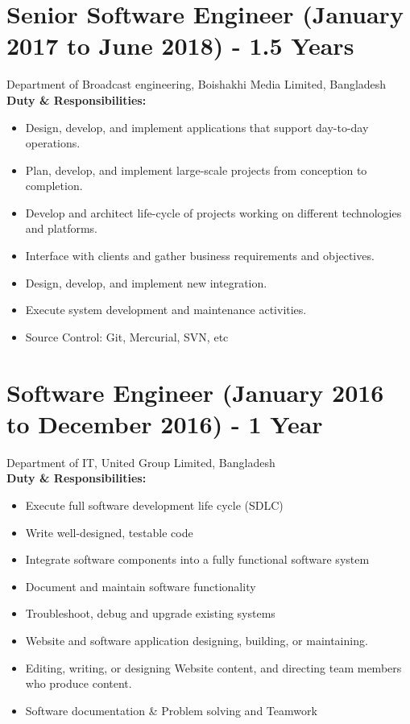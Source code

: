 \documentclass[10pt]{res}
\begin{document}
\begin{resume}
 
 

 
\vspace{20pt}
\section{Senior Software Engineer (January 2017 to June 2018) - 1.5 Years}
 Department of Broadcast engineering, Boishakhi Media Limited, Bangladesh\\
\textbf{Duty \& Responsibilities:}
    \begin{itemize}
        \item Design, develop, and implement applications that support day-to-day operations.
        \item Plan, develop, and implement large-scale projects from conception to completion.
        \item Develop and architect life-cycle of projects working on different technologies and platforms.
        \item Interface with clients and gather business requirements and objectives.
        \item Design, develop, and implement new integration.
        \item Execute system development and maintenance activities.
        \item Source Control: Git, Mercurial, SVN, etc
    \end{itemize}




 
\vspace{20pt}
\section{Software Engineer (January 2016 to December 2016) - 1 Year}
 Department of IT, United Group Limited, Bangladesh\\
\textbf{Duty \& Responsibilities:}
    \begin{itemize}
        \item Execute full software development life cycle (SDLC) 
        \item Write well-designed, testable code 
        \item Integrate software components into a fully functional software system
        \item Document and maintain software functionality
        \item Troubleshoot, debug and upgrade existing systems   
        \item Website and software application designing, building, or maintaining.
        \item Editing, writing, or designing Website content, and directing team members who produce content.
        \item Software documentation \& Problem solving and Teamwork 
    \end{itemize}
 



\end{resume}
\end{document}
